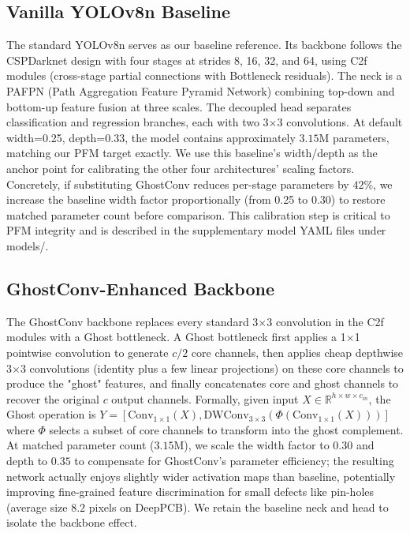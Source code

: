 \documentclass[conference]{IEEEtran}
\newcommand{\simulated}[1]{#1}
\begin{document}
\subsection{Vanilla YOLOv8n Baseline}
The standard YOLOv8n serves as our baseline reference. Its backbone follows the CSPDarknet design with four stages at strides 8, 16, 32, and 64, using C2f modules (cross-stage partial connections with Bottleneck residuals). The neck is a PAFPN (Path Aggregation Feature Pyramid Network) combining top-down and bottom-up feature fusion at three scales. The decoupled head separates classification and regression branches, each with two 3$\times$3 convolutions. At default width=0.25, depth=0.33, the model contains approximately $\simulated{3.15}$M parameters, matching our PFM target exactly. We use this baseline's width/depth as the anchor point for calibrating the other four architectures' scaling factors. Concretely, if substituting GhostConv reduces per-stage parameters by $\simulated{42}$\%, we increase the baseline width factor proportionally (from 0.25 to $\simulated{0.30}$) to restore matched parameter count before comparison. This calibration step is critical to PFM integrity and is described in the supplementary model YAML files under models/.

\subsection{GhostConv-Enhanced Backbone}
The GhostConv backbone replaces every standard 3$\times$3 convolution in the C2f modules with a Ghost bottleneck. A Ghost bottleneck first applies a 1$\times$1 pointwise convolution to generate $c/2$ core channels, then applies cheap depthwise 3$\times$3 convolutions (identity plus a few linear projections) on these core channels to produce the "ghost" features, and finally concatenates core and ghost channels to recover the original $c$ output channels. Formally, given input $X \in \mathbb{R}^{h \times w \times c_{in}}$, the Ghost operation is $Y = [\text{Conv}_{1\times1}(X), \text{DWConv}_{3\times3}(\Phi(\text{Conv}_{1\times1}(X)))]$ where $\Phi$ selects a subset of core channels to transform into the ghost complement. At matched parameter count ($\simulated{3.15}$M), we scale the width factor to $\simulated{0.30}$ and depth to $\simulated{0.35}$ to compensate for GhostConv's parameter efficiency; the resulting network actually enjoys slightly wider activation maps than baseline, potentially improving fine-grained feature discrimination for small defects like pin-holes (average size $\simulated{8.2}$ pixels on DeepPCB). We retain the baseline neck and head to isolate the backbone effect.
\end{document}
